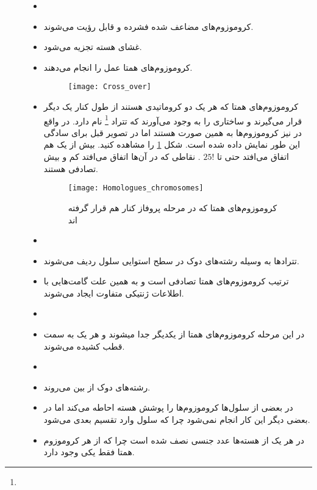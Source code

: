\begin{description}
\item[]
\begin{itemize}
\item[]
\item کروموزوم‌های مضاعف شده فشرده و قابل رؤیت می‌شوند.
\item غشای هسته تجزیه می‌شود.
\item کروموزوم‌های همتا عمل 
را انجام می‌دهند.

\begin{figure}[htbp]
	\centering
	\texttt{[image: Cross\_over]}
\end{figure}

\item کروموزوم‌های همتا که هر یک دو کروماتیدی هستند از طول کنار یک دیگر قرار می‌گیرند و ساختاری را به وجود می‌آورند که تتراد 
\footnote{}
نام دارد. در واقع در
نیز کروموزوم‌ها به همین صورت هستند اما در تصویر قبل برای سادگی این طور نمایش داده شده است. شکل
\ref{figure:HomologuesChromosomes}
را مشاهده کنید. بیش‌ از یک
هم اتفاق می‌افتد حتی تا
$ 25! $
.
نقاطی که در آن‌ها
اتفاق می‌افتد کم و بیش تصادفی هستند.


\begin{figure}[htbp]
	\centering 
	\texttt{[image: Homologues\_chromosomes]}
	\caption{کروموزوم‌های همتا که در مرحله پروفاز
	کنار هم قرار گرفته اند}
	\label{figure:HomologuesChromosomes}
\end{figure}

\end{itemize}
\item[]
\begin{itemize}
\item[]
\item تتراد‌ها به وسیله رشته‌های دوک در سطح استوایی سلول ردیف می‌شوند.
\item ترتیب کروموزوم‌های همتا تصادفی است و به همین علت گامت‌هایی با اطلاعات ژنتیکی متفاوت ایجاد می‌شوند.
\end{itemize}
\item[]
\begin{itemize}
\item[]
\item در این مرحله کروموزوم‌های همتا از یکدیگر جدا میشوند و هر یک به سمت قطب کشیده‌ می‌شوند.
\end{itemize}

\pagebreak
\item[]
\begin{itemize}
\item[]
\item رشته‌های دوک از بین می‌روند.
\item در بعضی از سلول‌ها کروموزوم‌ها را پوشش هسته احاطه می‌کند اما در بعضی دیگر این کار انجام نمی‌شود چرا که سلول وارد تقسیم بعدی می‌شود.
\item در هر یک از هسته‌ها عدد جنسی نصف شده است چرا که از هر کروموزوم همتا فقط یکی وجود دارد.
\end{itemize}
\end{description}

